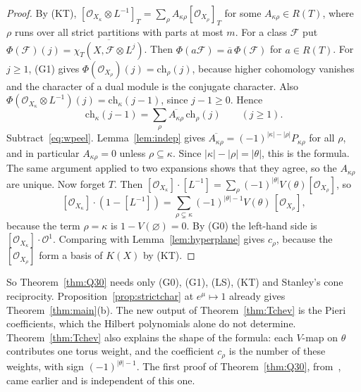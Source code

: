 \documentclass[11pt]{amsart}
\theoremstyle{definition}
\theoremstyle{remark}
\newcommand{\cO}{\mathcal{O}}
\begin{document}
\begin{proof}
By (KT), $[\cO_{X_\kappa}\otimes L^{-1}]_T=\sum_\rho A_{\kappa\rho}[\cO_{X_\rho}]_T$ for some
$A_{\kappa\rho}\in R(T)$, where $\rho$ runs over all strict partitions with parts at most $m$. For a class
$\mathcal F$ put $\Phi(\mathcal F)(j)=\overline{\chi_T(X,\mathcal F\otimes L^j)}$. Then
$\Phi(a\mathcal F)=\overline a\,\Phi(\mathcal F)$ for $a\in R(T)$. For $j\ge1$, (G1) gives
$\Phi(\cO_{X_\rho})(j)=\mathrm{ch}_\rho(j)$, because higher cohomology vanishes and the character of a dual
module is the conjugate character. Also $\Phi(\cO_{X_\kappa}\otimes L^{-1})(j)=\mathrm{ch}_\kappa(j-1)$,
since $j-1\ge0$. Hence
\[ \mathrm{ch}_\kappa(j-1)=\sum_\rho\overline{A_{\kappa\rho}}\,\mathrm{ch}_\rho(j)\qquad(j\ge1). \]
Subtract~\eqref{eq:wpeel}. Lemma~\ref{lem:indep} gives
$\overline{A_{\kappa\rho}}=(-1)^{|\kappa|-|\rho|}P_{\kappa\rho}$ for all $\rho$, and in particular
$A_{\kappa\rho}=0$ unless $\rho\subseteq\kappa$. Since $|\kappa|-|\rho|=|\theta|$, this is the formula.
The same argument applied to two expansions shows that they agree, so the $A_{\kappa\rho}$ are unique.
Now forget $T$. Then $[\cO_{X_\kappa}]\cdot[L^{-1}]=\sum_\rho(-1)^{|\theta|}V(\theta)[\cO_{X_\rho}]$, so
\[ [\cO_{X_\kappa}]\cdot(1-[L^{-1}])=\sum_{\rho\subsetneq\kappa}(-1)^{|\theta|-1}V(\theta)\,[\cO_{X_\rho}], \]
because the term $\rho=\kappa$ is $1-V(\varnothing)=0$. By (G0) the left-hand side is
$[\cO_{X_\kappa}]\cdot\cO^1$. Comparing with Lemma~\ref{lem:hyperplane} gives $c_\rho$, because the
$[\cO_{X_\rho}]$ form a basis of $K(X)$ by (KT).
\end{proof}

So Theorem~\ref{thm:Q30} needs only (G0), (G1), (LS), (KT) and Stanley's cone reciprocity.
Proposition~\ref{prop:strictchar} at $e^\mu\mapsto1$ already gives Theorem~\ref{thm:main}(b). The new
output of Theorem~\ref{thm:Tchev} is the Pieri coefficients, which the Hilbert polynomials alone do not
determine. Theorem~\ref{thm:Tchev} also explains the
shape of the formula: each $V$-map on $\theta$ contributes one torus weight, and the coefficient
$c_\rho$ is the number of these weights, with sign $(-1)^{|\theta|-1}$. The first proof of
Theorem~\ref{thm:Q30}, from~\cite{BR12}, came earlier and is independent of this one.
\end{document}
